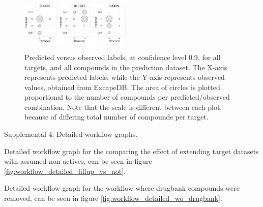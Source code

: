 \documentclass[utf8]{frontiersSCNS} %
\begin{document}
\begin{figure}[h!]
\includegraphics[width=0.15\textwidth]{figures/validation_plots/slc6a2_0p9_valplot.pdf}
\includegraphics[width=0.15\textwidth]{figures/validation_plots/slc6a3_0p9_valplot.pdf}
\vspace*{10pt} %
\includegraphics[width=0.15\textwidth]{figures/validation_plots/slc6a4_0p9_valplot.pdf}

    \caption{Predicted versus observed labels, at confidence level 0.9,
    for all targets, and all compounds in the prediction dataset.
    The X-axis represents predicted labels, while the Y-axis represents observed values,
    obtained from ExcapeDB. The area of circles is plotted proportional to the number of
    compounds per predicted/observed combination. Note that the scale is different between
    each plot, because of differing total number of compounds per target.
    }
    \label{fig:valplots_all_0.9}
\end{figure}

Supplemental 4: Detailed workflow graphs.

Detailed workflow graph for the comparing the effect of extending target
datasets with assumed non-actives, can be seen in figure
\ref{fig:workflow_detailed_fillup_vs_not}.

Detailed workflow graph for the workflow where drugbank compounds were removed,
can be seen in figure \ref{fig:workflow_detailed_wo_drugbank}.
\end{document}
